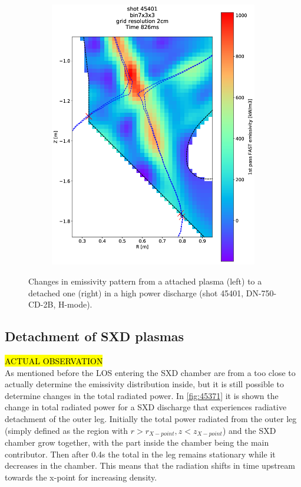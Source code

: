 \begin{figure}
\begin{subfigure}{0.21\textwidth}
         \includegraphics[trim={70 0 0 0},clip,width=\textwidth]{Chapters/chapter2/figs/45401_3.png}
         \label{fig:45401_3}
     \end{subfigure}
    \caption{Changes in emissivity pattern from a attached plasma (left) to a detached one (right) in a high power discharge (shot 45401, DN-750-CD-2B, H-mode).}
    \label{fig:45401}
\end{figure}

\subsection{Detachment of SXD plasmas}
\hl{ACTUAL OBSERVATION}\\
As mentioned before the LOS entering the SXD chamber are from a too close to actually determine the emissivity distribution inside, but it is still possible to determine changes in the total radiated power. In \autoref{fig:45371} it is shown the change in total radiated power for a SXD discharge that experiences radiative detachment of the outer leg. Initially the total power radiated from the outer leg (simply defined as the region with $r>r_{X-point}, z<z_{X-point}$) and the SXD chamber grow together, with the part inside the chamber being the main contributor. Then after 0.4s the total in the leg remains stationary while it decreases in the chamber. This means that the radiation shifts in time upstream towards the x-point for increasing density.

